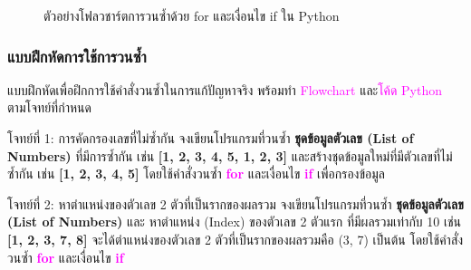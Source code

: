 \documentclass[12pt,a4paper]{article}
\newcommand{\textlight}[1]{{\thailightfont #1}}
\begin{document}
\vspace{4cm}

\begin{figure}[H]
\centering
{}
\caption{ตัวอย่างโฟลวชาร์ตการวนซ้ำด้วย for และเงื่อนไข if ใน Python}
\end{figure}

\vspace{10cm}

\subsubsection{แบบฝึกหัดการใช้การวนซ้ำ}
\textlight{แบบฝึกหัดเพื่อฝึกการใช้คำสั่งวนซ้ำในการแก้ปัญหาจริง พร้อมทำ \textcolor{magenta}{Flowchart} และ\textcolor{magenta}{โค้ด Python} ตามโจทย์ที่กำหนด}

\begin{exercisebox}{โจทย์ที่ 1: การคัดกรองเลขที่ไม่ซ้ำกัน}
\textlight{จงเขียนโปรแกรมที่วนซ้ำ \textbf{ชุดข้อมูลตัวเลข (List of Numbers)} ที่มีการซ้ำกัน เช่น \textbf{[1, 2, 3, 4, 5, 1, 2, 3]} และสร้างชุดข้อมูลใหม่ที่มีตัวเลขที่ไม่ซ้ำกัน เช่น \textbf{[1, 2, 3, 4, 5]} โดยใช้คำสั่งวนซ้ำ \textbf{\textcolor{magenta}{for}} และเงื่อนไข \textbf{\textcolor{magenta}{if}} เพื่อกรองข้อมูล}
\end{exercisebox}

\begin{exercisebox}{โจทย์ที่ 2: หาตำแหน่งของตัวเลข 2 ตัวที่เป็นรากของผลรวม}
\textlight{จงเขียนโปรแกรมที่วนซ้ำ \textbf{ชุดข้อมูลตัวเลข (List of Numbers)} และ หาตำแหน่ง (Index) ของตัวเลข 2 ตัวแรก ที่มีผลรวมเท่ากับ 10 เช่น \textbf{[1, 2, 3, 7, 8]} จะได้ตำแหน่งของตัวเลข 2 ตัวที่เป็นรากของผลรวมคือ (3, 7) เป็นต้น โดยใช้คำสั่งวนซ้ำ \textbf{\textcolor{magenta}{for}} และเงื่อนไข \textbf{\textcolor{magenta}{if}}}
\end{exercisebox}
\end{document}
